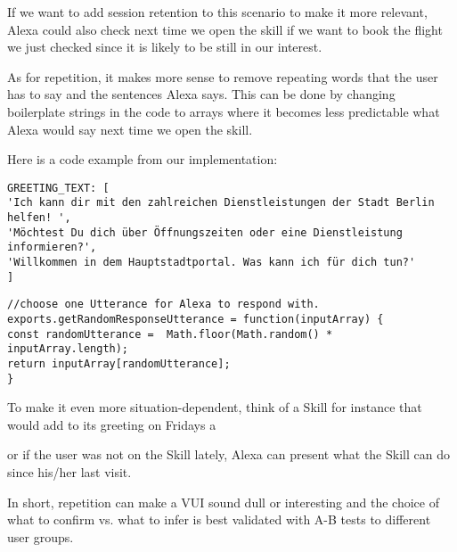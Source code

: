 \noindent If we want to add session retention to this scenario to make it more relevant, Alexa could also check next time we open the skill if we want to book the flight we just checked since it is likely to be still in our interest.

As for repetition, it makes more sense to remove repeating words that the user has to say and the sentences Alexa says. This can be done by changing boilerplate strings in the code to arrays where it becomes less predictable what Alexa would say next time we open the skill.

\noindent  Here is a code example from our implementation:

\begin{verbatim}
GREETING_TEXT: [
'Ich kann dir mit den zahlreichen Dienstleistungen der Stadt Berlin helfen! ',
'Möchtest Du dich über Öffnungszeiten oder eine Dienstleistung informieren?',
'Willkommen in dem Hauptstadtportal. Was kann ich für dich tun?'
]
\end{verbatim}

\begin{verbatim}
//choose one Utterance for Alexa to respond with.
exports.getRandomResponseUtterance = function(inputArray) {
const randomUtterance =  Math.floor(Math.random() * inputArray.length);
return inputArray[randomUtterance];
}
\end{verbatim}

\noindent To make it even more situation-dependent, think of a Skill for instance that would add to its greeting on Fridays a 


\begin{flushright}
\end{flushright}


\noindent or if the user was not on the Skill lately, Alexa can present what the Skill can do since his/her last visit.



In short, repetition can make a VUI sound dull or interesting and the choice of what to confirm vs. what to infer is best validated with A-B tests to different user groups.





